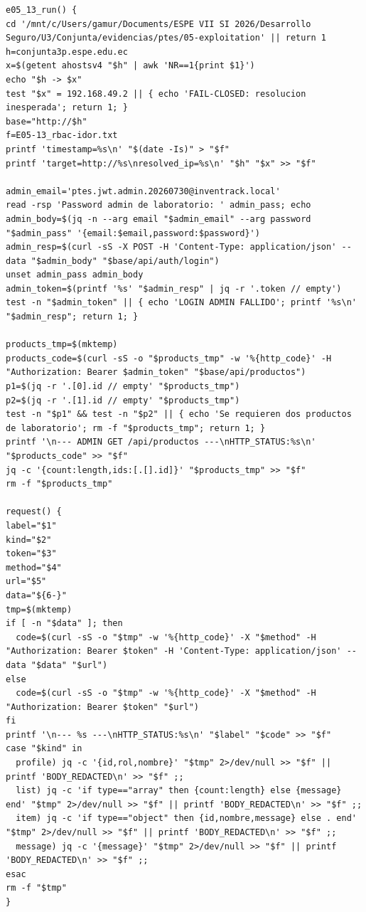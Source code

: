 \begin{tcolorbox}[codebox]
\begin{Verbatim}[fontsize=\scriptsize,breaklines=true,breakanywhere=true]
e05_13_run() {
cd '/mnt/c/Users/gamur/Documents/ESPE VII SI 2026/Desarrollo Seguro/U3/Conjunta/evidencias/ptes/05-exploitation' || return 1
h=conjunta3p.espe.edu.ec
x=$(getent ahostsv4 "$h" | awk 'NR==1{print $1}')
echo "$h -> $x"
test "$x" = 192.168.49.2 || { echo 'FAIL-CLOSED: resolucion inesperada'; return 1; }
base="http://$h"
f=E05-13_rbac-idor.txt
printf 'timestamp=%s\n' "$(date -Is)" > "$f"
printf 'target=http://%s\nresolved_ip=%s\n' "$h" "$x" >> "$f"

admin_email='ptes.jwt.admin.20260730@inventrack.local'
read -rsp 'Password admin de laboratorio: ' admin_pass; echo
admin_body=$(jq -n --arg email "$admin_email" --arg password "$admin_pass" '{email:$email,password:$password}')
admin_resp=$(curl -sS -X POST -H 'Content-Type: application/json' --data "$admin_body" "$base/api/auth/login")
unset admin_pass admin_body
admin_token=$(printf '%s' "$admin_resp" | jq -r '.token // empty')
test -n "$admin_token" || { echo 'LOGIN ADMIN FALLIDO'; printf '%s\n' "$admin_resp"; return 1; }

products_tmp=$(mktemp)
products_code=$(curl -sS -o "$products_tmp" -w '%{http_code}' -H "Authorization: Bearer $admin_token" "$base/api/productos")
p1=$(jq -r '.[0].id // empty' "$products_tmp")
p2=$(jq -r '.[1].id // empty' "$products_tmp")
test -n "$p1" && test -n "$p2" || { echo 'Se requieren dos productos de laboratorio'; rm -f "$products_tmp"; return 1; }
printf '\n--- ADMIN GET /api/productos ---\nHTTP_STATUS:%s\n' "$products_code" >> "$f"
jq -c '{count:length,ids:[.[].id]}' "$products_tmp" >> "$f"
rm -f "$products_tmp"

request() {
label="$1"
kind="$2"
token="$3"
method="$4"
url="$5"
data="${6-}"
tmp=$(mktemp)
if [ -n "$data" ]; then
  code=$(curl -sS -o "$tmp" -w '%{http_code}' -X "$method" -H "Authorization: Bearer $token" -H 'Content-Type: application/json' --data "$data" "$url")
else
  code=$(curl -sS -o "$tmp" -w '%{http_code}' -X "$method" -H "Authorization: Bearer $token" "$url")
fi
printf '\n--- %s ---\nHTTP_STATUS:%s\n' "$label" "$code" >> "$f"
case "$kind" in
  profile) jq -c '{id,rol,nombre}' "$tmp" 2>/dev/null >> "$f" || printf 'BODY_REDACTED\n' >> "$f" ;;
  list) jq -c 'if type=="array" then {count:length} else {message} end' "$tmp" 2>/dev/null >> "$f" || printf 'BODY_REDACTED\n' >> "$f" ;;
  item) jq -c 'if type=="object" then {id,nombre,message} else . end' "$tmp" 2>/dev/null >> "$f" || printf 'BODY_REDACTED\n' >> "$f" ;;
  message) jq -c '{message}' "$tmp" 2>/dev/null >> "$f" || printf 'BODY_REDACTED\n' >> "$f" ;;
esac
rm -f "$tmp"
}


\end{Verbatim}
\end{tcolorbox}
